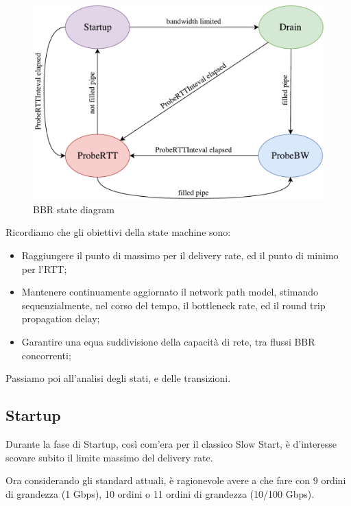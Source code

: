 \begin{figure}[H]

\center
\caption{BBR state diagram}
\includegraphics[scale=0.6]{chapters/bbr/img/state_diagram}

\end{figure}

Ricordiamo che gli obiettivi della state machine sono:

\begin{itemize}

\item Raggiungere il punto di massimo per il delivery rate, ed il punto di minimo per l'RTT;

\item Mantenere continuamente aggiornato il network path model, stimando sequenzialmente, nel corso del tempo, il bottleneck rate, ed il round trip propagation delay;

\item Garantire una equa suddivisione della capacità di rete, tra flussi BBR concorrenti;

\end{itemize}

Passiamo poi all'analisi degli stati, e delle transizioni.

\subsection{Startup}

Durante la fase di Startup, così com'era per il classico Slow Start, è d'interesse scovare subito il limite massimo del delivery rate. \bigskip

Ora considerando gli standard attuali, è ragionevole avere a che fare con 9 ordini di grandezza (1 Gbps), 10 ordini o 11 ordini di grandezza (10/100 Gbps). \bigskip


